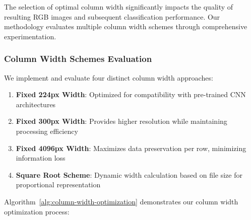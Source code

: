 The selection of optimal column width significantly impacts the quality of resulting RGB images and subsequent classification performance. Our methodology evaluates multiple column width schemes through comprehensive experimentation.

\subsubsection{Column Width Schemes Evaluation}

We implement and evaluate four distinct column width approaches:

\begin{enumerate}
    \item \textbf{Fixed 224px Width}: Optimized for compatibility with pre-trained CNN architectures
    \item \textbf{Fixed 300px Width}: Provides higher resolution while maintaining processing efficiency
    \item \textbf{Fixed 4096px Width}: Maximizes data preservation per row, minimizing information loss
    \item \textbf{Square Root Scheme}: Dynamic width calculation based on file size for proportional representation
\end{enumerate}

Algorithm~\ref{alg:column-width-optimization} demonstrates our column width optimization process:

